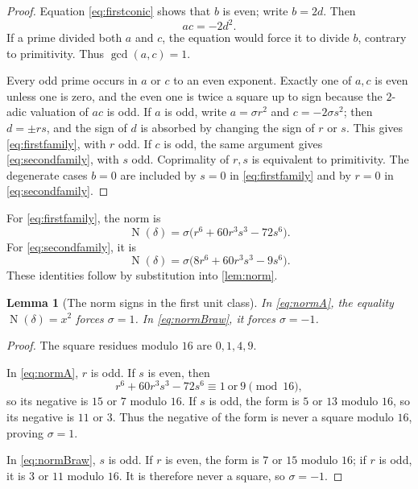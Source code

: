 \documentclass[11pt,a4paper]{article}
\newtheorem{lemma}[lemma]{Lemma}
\newcommand{\Norm}{\operatorname{N}}
\begin{document}
\begin{proof}
Equation \eqref{eq:firstconic} shows that $b$ is even; write $b=2d$.
Then
\[
ac=-2d^2.
\]
If a prime divided both $a$ and $c$, the equation would force it to divide
$b$, contrary to primitivity.  Thus $\gcd(a,c)=1$.

Every odd prime occurs in $a$ or $c$ to an even exponent.  Exactly one of
$a,c$ is even unless one is zero, and the even one is twice a square up to
sign because the $2$-adic valuation of $ac$ is odd.  If $a$ is odd, write
$a=\sigma r^2$ and $c=-2\sigma s^2$; then $d=\pm rs$, and the sign of
$d$ is absorbed by changing the sign of $r$ or $s$.  This gives
\eqref{eq:firstfamily}, with $r$ odd.  If $c$ is odd, the same argument
gives \eqref{eq:secondfamily}, with $s$ odd.  Coprimality of $r,s$ is
equivalent to primitivity.  The degenerate cases $b=0$ are included by
$s=0$ in \eqref{eq:firstfamily} and by $r=0$ in
\eqref{eq:secondfamily}.
\end{proof}

For \eqref{eq:firstfamily}, the norm is
\begin{equation}\label{eq:normA}
\Norm(\delta)
 =\sigma\bigl(r^6+60r^3s^3-72s^6\bigr).
\end{equation}
For \eqref{eq:secondfamily}, it is
\begin{equation}\label{eq:normBraw}
\Norm(\delta)
 =\sigma\bigl(8r^6+60r^3s^3-9s^6\bigr).
\end{equation}
These identities follow by substitution into \cref{lem:norm}.

\begin{lemma}[The norm signs in the first unit class]\label{lem:signfirst}
In \eqref{eq:normA}, the equality $\Norm(\delta)=x^2$ forces
$\sigma=1$.  In \eqref{eq:normBraw}, it forces $\sigma=-1$.
\end{lemma}

\begin{proof}
The square residues modulo $16$ are $0,1,4,9$.

In \eqref{eq:normA}, $r$ is odd.  If $s$ is even, then
\[
r^6+60r^3s^3-72s^6\equiv1\ \text{or}\ 9\pmod{16},
\]
so its negative is $15$ or $7$ modulo $16$.  If $s$ is odd, the form is
$5$ or $13$ modulo $16$, so its negative is $11$ or $3$.  Thus the
negative of the form is never a square modulo $16$, proving $\sigma=1$.

In \eqref{eq:normBraw}, $s$ is odd.  If $r$ is even, the form is $7$ or
$15$ modulo $16$; if $r$ is odd, it is $3$ or $11$ modulo $16$.  It is
therefore never a square, so $\sigma=-1$.
\end{proof}
\end{document}
